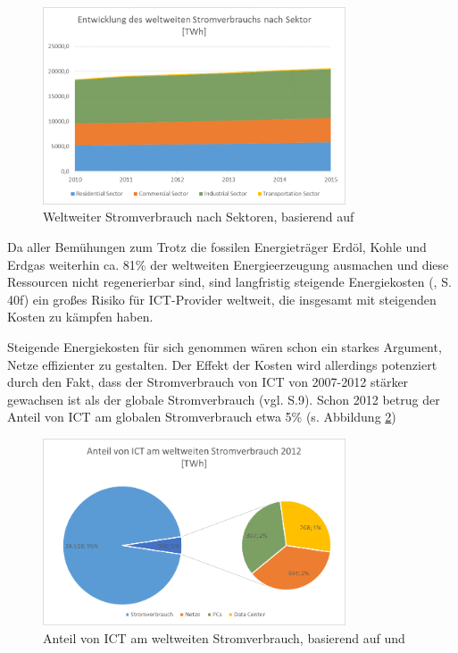\documentclass[12pt,titlepage]{article}
\begin{document}
\begin{figure}[!ht]
	\centering
	\includegraphics[width=0.8\textwidth]{Anteil_Strom_Sektor}
	\caption{Weltweiter Stromverbrauch nach Sektoren, basierend auf \cite{bibid}}
	\label{fig:Strom_Sektor}
\end{figure}
Da aller Bemühungen zum Trotz die fossilen Energieträger Erdöl, Kohle und Erdgas weiterhin ca. 81\% der weltweiten Energieerzeugung ausmachen \cite{statista} und diese Ressourcen nicht regenerierbar sind, sind langfristig steigende Energiekosten (\cite{iea2015}, S. 40f) ein großes Risiko für ICT-Provider weltweit, die insgesamt mit steigenden Kosten zu kämpfen haben.

Steigende Energiekosten für sich genommen wären schon ein starkes Argument, Netze effizienter zu gestalten.  Der Effekt der Kosten wird allerdings potenziert durch den Fakt, dass der Stromverbrauch von ICT von 2007-2012 stärker gewachsen ist als der globale Stromverbrauch (vgl. \cite{vanHeggedhem} S.9). Schon 2012 betrug der Anteil von ICT am globalen Stromverbrauch etwa 5\% (s. Abbildung \ref{fig:ICT_Strom}) 

\begin{figure}[!ht]
	\centering
	\includegraphics[width=0.8\textwidth]{Anteil_ICT_Strom}
	\caption{Anteil von ICT am weltweiten Stromverbrauch, basierend auf \cite{bibid} und \cite{bibid}}
	\label{fig:ICT_Strom}
\end{figure}
\end{document}
